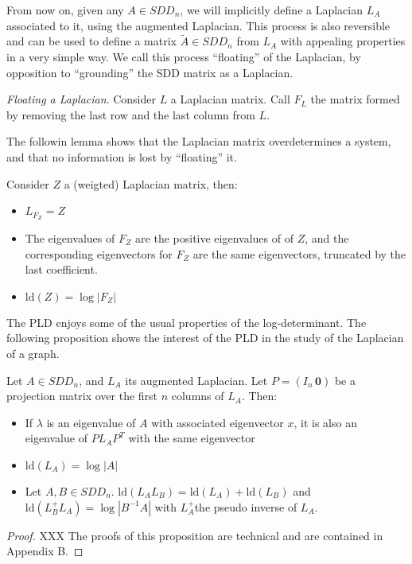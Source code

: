 From now on, given any $A\in SDD_{n}$, we will implicitly define
a Laplacian $L_{A}$ associated to it, using the augmented Laplacian.
This process is also reversible and can be used to define a matrix
$\tilde{A}\in SDD_{n}$ from $L_{A}$ with appealing properties in
a very simple way. We call this process ``floating'' of the Laplacian,
by opposition to ``grounding'' the SDD matrix as a Laplacian. 

\begin{definition}\emph{Floating a Laplacian}. Consider $L$ a Laplacian
matrix. Call $F_{L}$ the matrix formed by removing the last row and
the last column from $L$.

\end{definition}

The followin lemma shows that the Laplacian matrix overdetermines
a system, and that no information is lost by ``floating'' it.

\begin{lemma}Consider $Z$ a (weigted) Laplacian matrix, then:
\begin{itemize}
\item $L_{F_{Z}}=Z$
\item The eigenvalues of $F_{Z}$ are the positive eigenvalues of of $Z$,
and the corresponding eigenvectors for $F_{Z}$ are the same eigenvectors,
truncated by the last coefficient.
\item $\text{ld}\left(Z\right)=\log\left|F_{Z}\right|$
\end{itemize}
\end{lemma}

The PLD enjoys some of the usual properties of the log-determinant.
The following proposition shows the interest of the PLD in the study
of the Laplacian of a graph. 

\begin{proposition} \label{pro:pld-properties}Let $A\in SDD_{n}$,
and $L_{A}$ its augmented Laplacian. Let $P=\left(I_{n}\,\mathbf{0}\right)$
be a projection matrix over the first $n$ columns of $L_{A}$. Then:\end{proposition} 
\begin{itemize}
\item If $\lambda$ is an eigenvalue of $A$ with associated eigenvector
$x$, it is also an eigenvalue of $PL_{A}P^{T}$ with the same eigenvector 
\item $\text{ld}\left(L_{A}\right)=\log\left|A\right|$ 
\item Let $A,B\in SDD_{n}$. $\text{ld}\left(L_{A}L_{B}\right)=\text{ld}\left(L_{A}\right)+\text{ld}\left(L_{B}\right)$
and $\text{ld}\left(L_{B}^{+}L_{A}\right)=\log\left|B^{-1}A\right|$
with $L_{A}^{+}$the pseudo inverse of $L_{A}$. 
\end{itemize}
\begin{proof}XXX The proofs of this proposition are technical and
are contained in Appendix B. \end{proof} 

